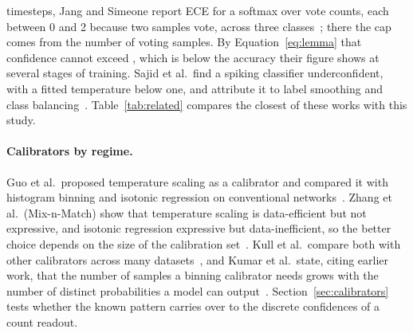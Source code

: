 \documentclass[10pt]{article}
\begin{document}
timesteps, Jang and Simeone report ECE for a softmax over vote counts, each between 0 and 2
because two samples vote, across three classes~\citep{jang2022multisample}; there the cap comes
from the number of voting samples. By Equation~\eqref{eq:lemma} that confidence cannot exceed %
\ceilThreeTwoShort, which is below the accuracy their figure shows at several stages of %
training. Sajid et al.\ find a spiking classifier underconfident, with a fitted temperature below
one, and attribute it to label smoothing and class balancing~\citep{sajid2026convsnn}. %
Table~\ref{tab:related} compares the closest of these works with this study.

\paragraph{Calibrators by regime.}
Guo et al.\ proposed temperature scaling as a calibrator and compared it with histogram binning and
isotonic regression on conventional networks~\citep{guo2017calibration}. Zhang et al.\ (Mix-n-Match) show that %
temperature scaling is data-efficient but not expressive, and isotonic regression expressive but
data-inefficient, so the better choice depends on the size of the calibration
set~\citep{zhang2020mixnmatch}. Kull et al.\ compare both with other calibrators across many %
datasets~\citep{kull2019beyond}, and Kumar et al.\ state, citing earlier work, that the number of samples a binning %
calibrator needs grows with the number of distinct probabilities a model can %
output~\citep{kumar2019verified}. Section~\ref{sec:calibrators} tests whether the known pattern
carries over to the discrete confidences of a count readout.
\end{document}
